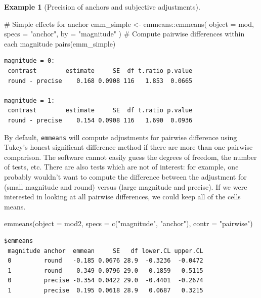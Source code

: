 \documentclass[
  11pt,
  letterpaper,
]{scrbook}
\newenvironment{Shaded}{\begin{snugshade}}{\end{snugshade}}
\newcommand{\AttributeTok}[1]{\textcolor[rgb]{0.40,0.45,0.13}{#1}}
\newcommand{\CommentTok}[1]{\textcolor[rgb]{0.37,0.37,0.37}{#1}}
\newcommand{\FunctionTok}[1]{\textcolor[rgb]{0.28,0.35,0.67}{#1}}
\newcommand{\NormalTok}[1]{\textcolor[rgb]{0.00,0.23,0.31}{#1}}
\newcommand{\OtherTok}[1]{\textcolor[rgb]{0.00,0.23,0.31}{#1}}
\newcommand{\SpecialCharTok}[1]{\textcolor[rgb]{0.37,0.37,0.37}{#1}}
\newcommand{\StringTok}[1]{\textcolor[rgb]{0.13,0.47,0.30}{#1}}
\theoremstyle{definition}
\theoremstyle{definition}
\newtheorem{example}{Example}[chapter]
\theoremstyle{remark}
\begin{document}
\begin{example}[Precision of anchors and subjective
adjustments]
\begin{Shaded}
\begin{Highlighting}[]
\CommentTok{\# Simple effects for anchor}
\NormalTok{emm\_simple }\OtherTok{\textless{}{-}}\NormalTok{ emmeans}\SpecialCharTok{::}\FunctionTok{emmeans}\NormalTok{(}
  \AttributeTok{object =}\NormalTok{ mod,}
  \AttributeTok{specs =} \StringTok{"anchor"}\NormalTok{,}
  \AttributeTok{by =} \StringTok{"magnitude"}
\NormalTok{)}
\CommentTok{\# Compute pairwise differences within each magnitude}
\FunctionTok{pairs}\NormalTok{(emm\_simple)}
\end{Highlighting}
\end{Shaded}

\begin{verbatim}
magnitude = 0:
 contrast        estimate     SE  df t.ratio p.value
 round - precise    0.168 0.0908 116   1.853  0.0665

magnitude = 1:
 contrast        estimate     SE  df t.ratio p.value
 round - precise    0.154 0.0908 116   1.690  0.0936
\end{verbatim}

By default, \texttt{emmeans} will compute adjustments for pairwise
difference using Tukey's honest significant difference method if there
are more than one pairwise comparison. The software cannot easily guess
the degrees of freedom, the number of tests, etc. There are also tests
which are not of interest: for example, one probably wouldn't want to
compute the difference between the adjustment for (small magnitude and
round) versus (large magnitude and precise). If we were interested in
looking at all pairwise differences, we could keep all of the cells
means.

\begin{Shaded}
\begin{Highlighting}[]
\FunctionTok{emmeans}\NormalTok{(}\AttributeTok{object =}\NormalTok{ mod2, }
        \AttributeTok{specs =} \FunctionTok{c}\NormalTok{(}\StringTok{"magnitude"}\NormalTok{, }\StringTok{"anchor"}\NormalTok{), }
        \AttributeTok{contr =} \StringTok{"pairwise"}\NormalTok{)}
\end{Highlighting}
\end{Shaded}

\begin{verbatim}
$emmeans
 magnitude anchor  emmean     SE   df lower.CL upper.CL
 0         round   -0.185 0.0676 28.9  -0.3236  -0.0472
 1         round    0.349 0.0796 29.0   0.1859   0.5115
 0         precise -0.354 0.0422 29.0  -0.4401  -0.2674
 1         precise  0.195 0.0618 28.9   0.0687   0.3215


\end{verbatim}
\end{example}
\end{document}
